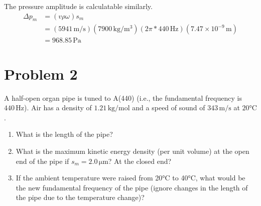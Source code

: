 \documentclass[12pt]{article}
\newcommand{\E}[1]{\times 10^{#1}}
\begin{document}
            The pressure amplitude is calculatable similarly.
            \begin{align}
                \Delta p_m  &=  (v \rho \omega) s_m\\
                    &=  (5941\,\unit{\meter/\second}) (7900\,\unit{\kilo\gram/\meter^3}) (2\pi * 440\,\unit{\hertz}) (7.47\E{-9}\,\unit{\meter})\\
                    &=  \boxed{968.85\,\unit{\pascal}}
            \end{align}
        
    \section{Problem 2}
        A half-open organ pipe is tuned to A(440) (i.e., the fundamental frequency is $440\,\unit{\hertz}$).
        Air has a density of $1.21\,\unit{\kilo\gram/\mole}$ and a speed of sound of $343\,\unit{\meter/\second}$ at $20\unit{\celsius}$.
        
        \begin{enumerate}[label=\alph*.]
            \item   What is the length of the pipe?
            \item   What is the maximum kinetic energy density (per unit volume) at the open end of the pipe if $s_m = 2.0\,\unit{\micro\meter}$?  At the closed end?
            \item   If the ambient temperature were raised from 20\unit{\celsius} to 40\unit{\celsius}, what would be the new fundamental frequency of the pipe (ignore changes in the length of the pipe due to the temperature change)?
        \end{enumerate}
    
\end{document}

